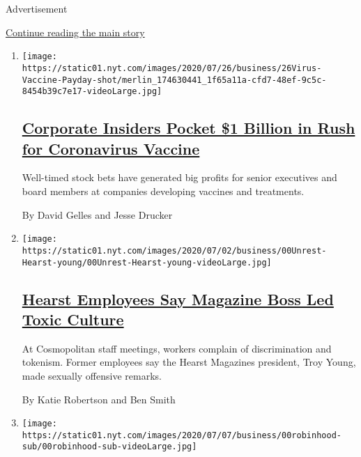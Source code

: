 Advertisement

\protect\hyperlink{after-subheader}{Continue reading the main story}

\begin{enumerate}
\def\labelenumi{\arabic{enumi}.}
\item
  \texttt{[image: https://static01.nyt.com/images/2020/07/26/business/26Virus-Vaccine-Payday-shot/merlin\_174630441\_1f65a11a-cfd7-48ef-9c5c-8454b39c7e17-videoLarge.jpg]}

  \hypertarget{corporate-insiders-pocket-1-billion-in-rush-for-coronavirus-vaccine}{%
  \subsection{\texorpdfstring{\href{/2020/07/25/business/coronavirus-vaccine-profits-vaxart.html}{Corporate
  Insiders Pocket \$1 Billion in Rush for Coronavirus
  Vaccine}}{Corporate Insiders Pocket \$1 Billion in Rush for Coronavirus Vaccine}}\label{corporate-insiders-pocket-1-billion-in-rush-for-coronavirus-vaccine}}

  Well-timed stock bets have generated big profits for senior executives
  and board members at companies developing vaccines and treatments.

  By David Gelles and Jesse Drucker
\item
  \texttt{[image: https://static01.nyt.com/images/2020/07/02/business/00Unrest-Hearst-young/00Unrest-Hearst-young-videoLarge.jpg]}

  \hypertarget{hearst-employees-say-magazine-boss-led-toxic-culture}{%
  \subsection{\texorpdfstring{\href{/2020/07/22/business/media/hearst-harassment-troy-young.html}{Hearst
  Employees Say Magazine Boss Led Toxic
  Culture}}{Hearst Employees Say Magazine Boss Led Toxic Culture}}\label{hearst-employees-say-magazine-boss-led-toxic-culture}}

  At Cosmopolitan staff meetings, workers complain of discrimination and
  tokenism. Former employees say the Hearst Magazines president, Troy
  Young, made sexually offensive remarks.

  By Katie Robertson and Ben Smith
\item
  \texttt{[image: https://static01.nyt.com/images/2020/07/07/business/00robinhood-sub/00robinhood-sub-videoLarge.jpg]}

  \hypertarget{robinhood-has-lured-young-traders-sometimes-with-devastating-results}{%
}
\end{enumerate}
